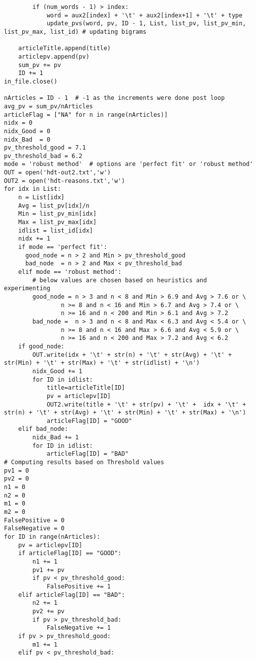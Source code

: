 \documentclass[oneside,10pt]{book}
\begin{document}
\begin{lstlisting}
        if (num_words - 1) > index:
            word = aux2[index] + '\t' + aux2[index+1] + '\t' + type
            update_pvs(word, pv, ID - 1, List, list_pv, list_pv_min, list_pv_max, list_id) # updating bigrams

    articleTitle.append(title)
    articlepv.append(pv)
    sum_pv += pv
    ID += 1
in_file.close()

nArticles = ID - 1  # -1 as the increments were done post loop
avg_pv = sum_pv/nArticles
articleFlag = ["NA" for n in range(nArticles)]
nidx = 0
nidx_Good = 0
nidx_Bad  = 0
pv_threshold_good = 7.1
pv_threshold_bad = 6.2
mode = 'robust method'  # options are 'perfect fit' or 'robust method'
OUT = open('hdt-out2.txt','w')
OUT2 = open('hdt-reasons.txt','w')
for idx in List:
    n = List[idx]
    Avg = list_pv[idx]/n
    Min = list_pv_min[idx]
    Max = list_pv_max[idx]
    idlist = list_id[idx]
    nidx += 1
    if mode == 'perfect fit':
      good_node = n > 2 and Min > pv_threshold_good
      bad_node  = n > 2 and Max < pv_threshold_bad
    elif mode == 'robust method': 
        # below values are chosen based on heuristics and experimenting 
        good_node = n > 3 and n < 8 and Min > 6.9 and Avg > 7.6 or \
                n >= 8 and n < 16 and Min > 6.7 and Avg > 7.4 or \
                n >= 16 and n < 200 and Min > 6.1 and Avg > 7.2
        bad_node =  n > 3 and n < 8 and Max < 6.3 and Avg < 5.4 or \
                n >= 8 and n < 16 and Max > 6.6 and Avg < 5.9 or \
                n >= 16 and n < 200 and Max > 7.2 and Avg < 6.2 
    if good_node:
        OUT.write(idx + '\t' + str(n) + '\t' + str(Avg) + '\t' + str(Min) + '\t' + str(Max) + '\t' + str(idlist) + '\n')
        nidx_Good += 1
        for ID in idlist:
            title=articleTitle[ID]
            pv = articlepv[ID]
            OUT2.write(title + '\t' + str(pv) + '\t' +  idx + '\t' + str(n) + '\t' + str(Avg) + '\t' + str(Min) + '\t' + str(Max) + '\n')
            articleFlag[ID] = "GOOD"
    elif bad_node:
        nidx_Bad += 1
        for ID in idlist:
            articleFlag[ID] = "BAD"
# Computing results based on Threshold values
pv1 = 0
pv2 = 0
n1 = 0
n2 = 0
m1 = 0
m2 = 0
FalsePositive = 0
FalseNegative = 0
for ID in range(nArticles):
    pv = articlepv[ID]
    if articleFlag[ID] == "GOOD":
        n1 += 1
        pv1 += pv
        if pv < pv_threshold_good:
            FalsePositive += 1
    elif articleFlag[ID] == "BAD":
        n2 += 1
        pv2 += pv
        if pv > pv_threshold_bad:
            FalseNegative += 1
    if pv > pv_threshold_good: 
        m1 += 1
    elif pv < pv_threshold_bad:  

\end{lstlisting}
\end{document}

